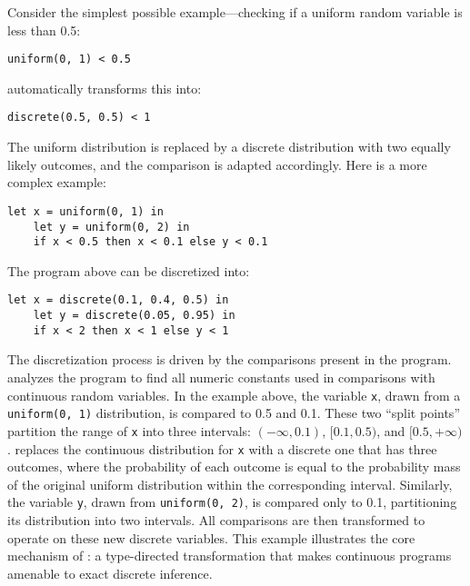 Consider the simplest possible example---checking if a uniform random variable is less than 0.5:

\begin{lstlisting}[aboveskip=1em,belowskip=1em]
    uniform(0, 1) < 0.5
\end{lstlisting}

\noindent \Slice{} automatically transforms this into:

\begin{lstlisting}[aboveskip=1em,belowskip=1em]
    discrete(0.5, 0.5) < 1
\end{lstlisting}

\noindent The uniform distribution is replaced by a discrete distribution with two equally likely outcomes, and the comparison is adapted accordingly. Here is a more complex example:

\begin{lstlisting}[aboveskip=1em,belowskip=1em]
    let x = uniform(0, 1) in
    let y = uniform(0, 2) in
    if x < 0.5 then x < 0.1 else y < 0.1
\end{lstlisting}

\noindent The program above can be discretized into:

\begin{lstlisting}[aboveskip=1em,belowskip=1em]
    let x = discrete(0.1, 0.4, 0.5) in
    let y = discrete(0.05, 0.95) in
    if x < 2 then x < 1 else y < 1
\end{lstlisting}

The discretization process is driven by the comparisons present in the program. \Slice{} analyzes the program to find all numeric constants used in comparisons with continuous random variables. In the example above, the variable \texttt{x}, drawn from a \texttt{uniform(0, 1)} distribution, is compared to 0.5 and 0.1. These two ``split points'' partition the range of \texttt{x} into three intervals: $(-\infty, 0.1)$, $[0.1, 0.5)$, and $[0.5, +\infty)$. \Slice{} replaces the continuous distribution for \texttt{x} with a discrete one that has three outcomes, where the probability of each outcome is equal to the probability mass of the original uniform distribution within the corresponding interval. Similarly, the variable \texttt{y}, drawn from \texttt{uniform(0, 2)}, is compared only to 0.1, partitioning its distribution into two intervals. All comparisons are then transformed to operate on these new discrete variables. This example illustrates the core mechanism of \Slice{}: a type-directed transformation that makes continuous programs amenable to exact discrete inference.


